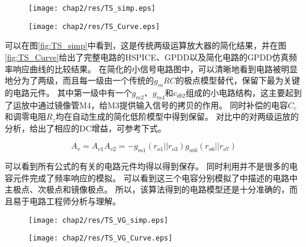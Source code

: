 \begin{figure}[!htp]
	\centering
	\texttt{[image: chap2/res/TS\_simp.eps]}
\end{figure}

\begin{figure}[!htp]
	\centering
	\texttt{[image: chap2/res/TS\_Curve.eps]}
\end{figure}

可以在图\ref{fig:TS_simp}中看到，这是传统两级运算放大器的简化结果，并在图\ref{fig:TS_Curve}给出了完整电路的HSPICE、GPDD以及简化电路的GPDD仿真频率响应曲线的比较结果。
在简化的小信号电路图中，可以清晰地看到电路被明显地分为了两级，而且每一级由一个传统的$g_m R C$的极点模型替代，保留下最为关键的电路元件。
其中第一级中有一个$g_{m2}$、$g_{m4}$和$c_{db2}$组成的小电路结构，这主要起到了运放中通过镜像管M4，给M3提供输入信号的拷贝的作用。
同时补偿的电容$C_c$和调零电阻$R_z$均在自动生成的简化低阶模型中得到保留。
对比\parencite{GRAY-Analog}中的对两级运放的分析，给出了相应的DC增益，可参考下式。

\begin{equation}
{A_v} = {A_{v1}}{A_{v2}} =  - {g_{m1}}\left( {{r_{o1}}||{r_{o3}}} \right){g_{m6}}\left( {{r_{o6}}||{r_{o7}}} \right)
\end{equation}

可以看到所有公式的有关的电路元件均得以得到保存。
同时利用并不是很多的电容元件完成了频率响应的模拟。
可以看到这三个电容分别模拟了\parencite{Allen-Analog}中描述的电路中主极点、次极点和镜像极点。
所以，该算法得到的电路模型还是十分准确的，而且易于电路工程师分析与理解。

\begin{figure}[!htp]
	\centering
	\texttt{[image: chap2/res/TS\_VG\_simp.eps]}
\end{figure}

\begin{figure}[!htp]
	\centering
	\texttt{[image: chap2/res/TS\_VG\_Curve.eps]}
\end{figure}

